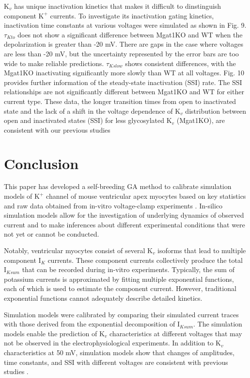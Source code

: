 \documentclass[10pt,letterpaper]{article}
\begin{document}
$\text{K}_{v}$ has unique inactivation kinetics that makes it difficult to dinstinguish component $\text{K}^{+}$ currents. To investigate its inactivation gating kinetics, inactivation time constants at various voltages were simulated as shown in Fig. 9. $\tau_{Kto}$ does not show a significant difference between Mgat1KO and WT when the depolarization is greater than -20 mV. There are gaps in the case where voltages are less than -20 mV, but the uncertainty represented by the error bars are too wide to make reliable predictions. $\tau_{Kslow}$ shows consistent differences, with the Mgat1KO inactivating significantly more slowly than WT at all voltages. Fig. 10 provides further information of the steady-state inactivation (SSI) rate. The SSI relationships are not significantly different between Mgat1KO and WT for either current type. These data, the longer transition times from open to inactivated state and the lack of a shift in the voltage dependence of $\text{K}_{v}$ distribution between open and inactivated states (SSI) for less glycosylated $\text{K}_{v}$ (Mgat1KO), are consistent with our previous studies \cite{schwetz2010n, ednie2015reduced, du2017}

\section*{Conclusion}
This paper has developed a self-breeding GA method to calibrate simulation models of $\text{K}^{+}$ channel of mouse ventricular apex myocytes based on key statistics and raw data obtained from in-vitro voltage-clamp experiments \cite{ednie2019reduced}. In-silico simulation models allow for the investigation of underlying dynamics of observed current and to make inferences about different experimental conditions that were not yet or cannot be conducted.

Notably, ventricular myocytes consist of several $\text{K}_{v}$ isoforms that lead to multiple component $\text{I}_{K}$ currents. These component currents collectively produce the total $\text{I}_{Ksum}$ that can be recorded during in-vitro experiments. Typically, the sum of potassium currents is approximated by fitting multiple exponential functions, each of which is used to estimate the component current. However, traditional exponential functions cannot adequately describe detailed kinetics.

Simulation models were calibrated by comparing their simulated current traces with those derived from the exponential decomposition of $\text{I}_{Ksum}$. The simulation models enable the prediction of $\text{K}_{v}$ characteristics at different voltages that may not be observed in the electrophysiological experiments. In addition to $\text{K}_{v}$ characteristics at 50 mV, simulation models show that changes of amplitudes, time constants, and SSI with different voltages are consistent with previous studies \cite{ednie2019reduced}.
\end{document}
